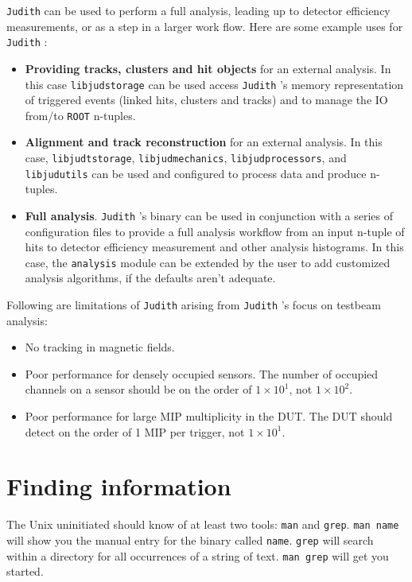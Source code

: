 \documentclass[10pt,a4paper]{book}
\newcommand{\ROOT}{\Verb`ROOT` }
\newcommand{\Judith}{\Verb`Judith` }
\begin{document}
\Judith can be used to perform a full analysis, leading up to detector efficiency measurements, or as a step in a larger work flow. Here are some example uses for \Judith:

\begin{itemize}
	\item \textbf{Providing tracks, clusters and hit objects} for an external analysis. In this case \Verb`libjudstorage` can be used access \Judith's memory representation of triggered events (linked hits, clusters and tracks) and to manage the IO from/to \ROOT n-tuples.
	\item \textbf{Alignment and track reconstruction} for an external analysis. In this case, \Verb`libjudtstorage`, \Verb`libjudmechanics`, \Verb`libjudprocessors`, and \Verb`libjudutils` can be used and configured to process data and produce n-tuples.
	\item \textbf{Full analysis}. \Judith's binary can be used in conjunction with a series of configuration files to provide a full analysis workflow from an input n-tuple of hits to detector efficiency measurement and other analysis histograms. In this case, the \Verb`analysis` module can be extended by the user to add customized analysis algorithms, if the defaults aren't adequate.
\end{itemize}

Following are limitations of \Judith arising from \Judith's focus on testbeam analysis:

\begin{itemize}
	\item No tracking in magnetic fields.
	\item Poor performance for densely occupied sensors. The number of occupied channels on a sensor should be on the order of $1\times10^1$, not $1\times10^2$.
	\item Poor performance for large MIP multiplicity in the DUT. The DUT should detect on the order of 1 MIP per trigger, not $1\times10^1$.
\end{itemize}

\section{Finding information}

The Unix uninitiated should know of at least two tools: \Verb`man` and \Verb`grep`. \Verb`man name` will show you the manual entry for the binary called \Verb`name`. \Verb`grep` will search within a directory for all occurrences of a string of text. \Verb`man grep` will get you started.
\end{document}
